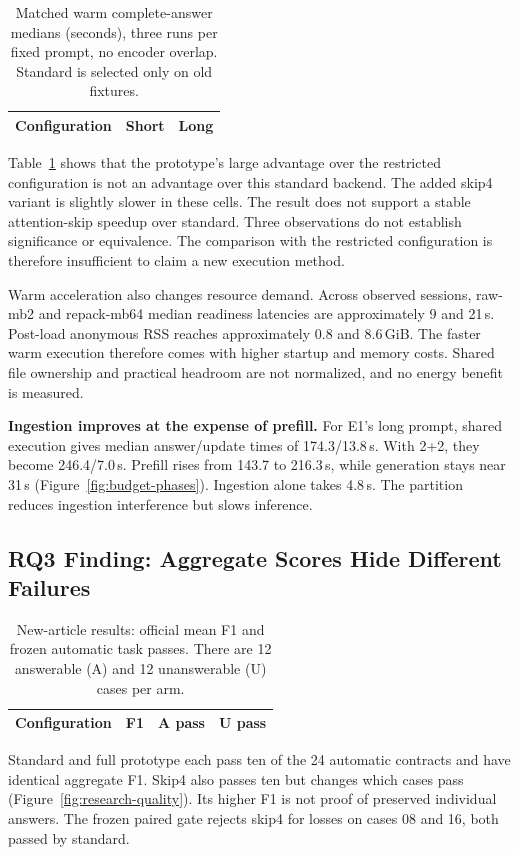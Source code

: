 \begin{table}[t]
\caption{Matched warm complete-answer medians (seconds), three runs per fixed
prompt, no encoder overlap. Standard is selected only on old fixtures.}
\label{tab:standard}
\centering
\begin{tabular}{lrr}
\toprule
Configuration & Short & Long\\
\midrule

\end{tabular}
\end{table}
Table~\ref{tab:standard} shows that the prototype's large advantage over the
restricted configuration is not an advantage over this standard backend.
The added skip4 variant is slightly slower in these cells. The result does not
support a stable attention-skip speedup over standard. Three observations do
not establish significance or equivalence. The comparison with the restricted configuration is therefore insufficient
to claim a new execution method.

Warm acceleration also changes resource demand. Across observed sessions,
raw-mb2 and repack-mb64 median readiness latencies are approximately 9 and 21\,s.
Post-load anonymous RSS reaches approximately 0.8 and 8.6\,GiB. The faster warm execution therefore comes with higher startup and memory costs. Shared file ownership
and practical headroom are not normalized, and no energy benefit is measured.


\textbf{Ingestion improves at the expense of prefill.} For E1's long prompt,
shared execution gives median answer/update times of 174.3/13.8\,s. With 2+2,
they become 246.4/7.0\,s. Prefill rises from 143.7 to 216.3\,s, while generation
stays near 31\,s (Figure~\ref{fig:budget-phases}). Ingestion alone takes 4.8\,s.
The partition reduces ingestion interference but slows inference.


\subsection{RQ3 Finding: Aggregate Scores Hide Different Failures}
\begin{table}[t]
\caption{New-article results: official mean F1 and frozen automatic task passes.
There are 12 answerable (A) and 12 unanswerable (U) cases per arm.}
\label{tab:new-quality}
\centering
\begin{tabular}{lrrr}
\toprule
Configuration & F1 & A pass & U pass\\
\midrule

\end{tabular}
\end{table}
Standard and full prototype each pass ten of the 24 automatic contracts and
have identical aggregate F1. Skip4 also passes ten but changes which cases pass
(Figure~\ref{fig:research-quality}). Its higher F1 is not proof of preserved
individual answers. The frozen paired gate rejects skip4 for losses on cases
08 and 16, both passed by standard.


